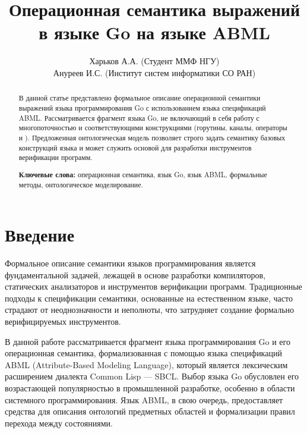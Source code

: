 \documentclass[12pt,twoside,russian]{article}
\newcommand{\textGoKeyword}[1]{{\color{goPurple}\textbf{#1}}}
\newcommand{\GoKeyword}[1]{\goinline{\textGoKeyword{#1}}}
\begin{document}

\def\udk{Lorem ipsum dolor sit amet}

\title{Операционная семантика выражений\\ в языке Go на языке ABML}

\author{Харьков А.А. (Студент ММФ НГУ)\\ Ануреев И.С. (Институт систем информатики СО РАН)}
\maketitle

\begin{abstract}
В данной статье представлено формальное описание операционной семантики выражений языка программирования Go с использованием языка спецификаций ABML. Рассматривается фрагмент языка Go, не включающий в себя работу с многопоточностью и соответствующими конструкциями (горутины, каналы, операторы \GoKeyword{go} и \GoKeyword{select}). Предложенная онтологическая модель позволяет строго задать семантику базовых конструкций языка и может служить основой для разработки инструментов верификации программ.

\textbf{Ключевые слова:} операционная семантика, язык Go, язык ABML, формальные методы, онтологическое моделирование.
\end{abstract}

\section{Введение}
Формальное описание семантики языков программирования является фундаментальной задачей, лежащей в основе разработки компиляторов, статических анализаторов и инструментов верификации программ. Традиционные подходы к спецификации семантики, основанные на естественном языке, часто страдают от неоднозначности и неполноты, что затрудняет создание формально верифицируемых инструментов.

В данной работе рассматривается фрагмент языка программирования Go и его операционная семантика, формализованная с помощью языка спецификаций ABML (Attribute-Based Modeling Language), который является лексическим расширением диалекта Common Lisp — SBCL. Выбор языка Go обусловлен его возрастающей популярностью в промышленной разработке, особенно в области системного программирования. Язык ABML, в свою очередь, предоставляет средства для описания онтологий предметных областей и формализации правил перехода между состояниями.
\end{document}
